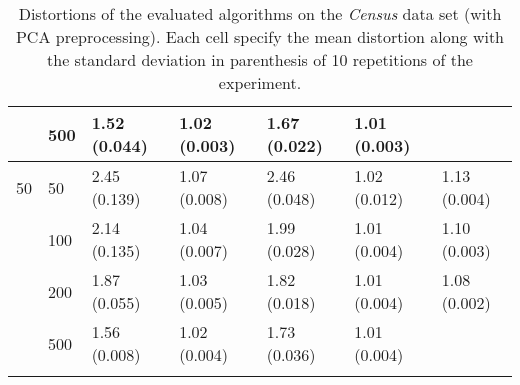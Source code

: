 \begin{longtable}{lllllll}
   & 500 &  1.52 (0.044) &   1.02 (0.003) &  1.67 (0.022) &         1.01 (0.003) &  \\
 \midrule
50 & 50  &  2.45 (0.139) &   1.07 (0.008) &  2.46 (0.048) &         1.02 (0.012) &  1.13 (0.004) \\
   & 100 &  2.14 (0.135) &   1.04 (0.007) &  1.99 (0.028) &         1.01 (0.004) &  1.10 (0.003) \\
   & 200 &  1.87 (0.055) &   1.03 (0.005) &  1.82 (0.018) &         1.01 (0.004) &  1.08 (0.002) \\
   & 500 &  1.56 (0.008) &   1.02 (0.004) &  1.73 (0.036) &         1.01 (0.004) &            \\
\bottomrule
\caption{Distortions of the evaluated algorithms on the \textit{Census} data set (with PCA preprocessing). Each cell specify the mean distortion along with the standard deviation in parenthesis of 10 repetitions of the experiment.}
\label{tab:distortions-mean-std-census-pca}
\end{longtable}

